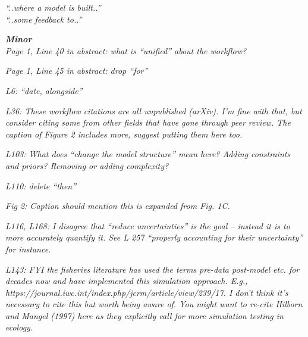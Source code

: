 \documentclass[11pt,letter]{article}
\begin{document}
\begin{mybox}
\emph{“..where a model is built..”\\
“..some feedback to..”}
\end{mybox}

\begin{mybox}
\emph{\textbf{Minor}\\
Page 1, Line 40 in abstract: what is “unified” about the workflow?}
\end{mybox}

\begin{mybox}
\emph{Page 1, Line 45 in abstract: drop “for”}
\end{mybox}

\begin{mybox}
\emph{L6: “date, alongside”}
\end{mybox}

\begin{mybox}
\emph{L36: These workflow citations are all unpublished (arXiv). I’m fine with that, but consider citing some from other fields that have gone through peer review. The caption of Figure 2 includes more, suggest putting them here too.}
\end{mybox}

\begin{mybox}
\emph{L103: What does “change the model structure” mean here? Adding constraints and priors? Removing or adding complexity?}
\end{mybox}

\begin{mybox}
\emph{L110: delete “then”}
\end{mybox}

\begin{mybox}
\emph{Fig 2: Caption should mention this is expanded from Fig. 1C.}
\end{mybox}

\begin{mybox}
\emph{L116, L168: I disagree that “reduce uncertainties” is the goal – instead it is to more accurately quantify it. See L 257 “properly accounting for their uncertainty” for instance.}
\end{mybox}

\begin{mybox}
\emph{L143: FYI the fisheries literature has used the terms pre-data post-model etc. for decades now and have implemented this simulation approach. E.g., https://journal.iwc.int/index.php/jcrm/article/view/239/17. I don’t think it’s necessary to cite this but worth being aware of. You might want to re-cite Hilborn and Mangel (1997) here as they explicitly call for more simulation testing in ecology.}
\end{mybox}
\end{document}
